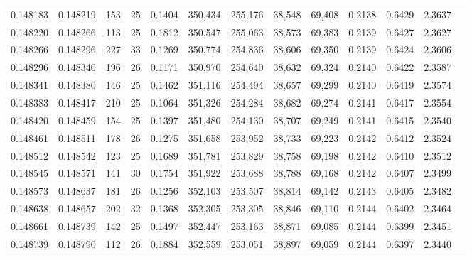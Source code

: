 \begin{tabular}{rrrrrrrrrrrrr}
0.148183 & 0.148219 & 153 &  25 &                                     0.1404 & 350,434 & 255,176 &  38,548 &  69,408 & 0.2138 & 0.6429 & 2.3637 \\
0.148220 & 0.148266 & 113 &  25 &                                     0.1812 & 350,547 & 255,063 &  38,573 &  69,383 & 0.2139 & 0.6427 & 2.3627 \\
0.148266 & 0.148296 & 227 &  33 &                                     0.1269 & 350,774 & 254,836 &  38,606 &  69,350 & 0.2139 & 0.6424 & 2.3606 \\
0.148296 & 0.148340 & 196 &  26 &                                     0.1171 & 350,970 & 254,640 &  38,632 &  69,324 & 0.2140 & 0.6422 & 2.3587 \\
0.148341 & 0.148380 & 146 &  25 &                                     0.1462 & 351,116 & 254,494 &  38,657 &  69,299 & 0.2140 & 0.6419 & 2.3574 \\
0.148383 & 0.148417 & 210 &  25 &                                     0.1064 & 351,326 & 254,284 &  38,682 &  69,274 & 0.2141 & 0.6417 & 2.3554 \\
0.148420 & 0.148459 & 154 &  25 &                                     0.1397 & 351,480 & 254,130 &  38,707 &  69,249 & 0.2141 & 0.6415 & 2.3540 \\
0.148461 & 0.148511 & 178 &  26 &                                     0.1275 & 351,658 & 253,952 &  38,733 &  69,223 & 0.2142 & 0.6412 & 2.3524 \\
0.148512 & 0.148542 & 123 &  25 &                                     0.1689 & 351,781 & 253,829 &  38,758 &  69,198 & 0.2142 & 0.6410 & 2.3512 \\
0.148545 & 0.148571 & 141 &  30 &                                     0.1754 & 351,922 & 253,688 &  38,788 &  69,168 & 0.2142 & 0.6407 & 2.3499 \\
0.148573 & 0.148637 & 181 &  26 &                                     0.1256 & 352,103 & 253,507 &  38,814 &  69,142 & 0.2143 & 0.6405 & 2.3482 \\
0.148638 & 0.148657 & 202 &  32 &                                     0.1368 & 352,305 & 253,305 &  38,846 &  69,110 & 0.2144 & 0.6402 & 2.3464 \\
0.148661 & 0.148739 & 142 &  25 &                                     0.1497 & 352,447 & 253,163 &  38,871 &  69,085 & 0.2144 & 0.6399 & 2.3451 \\
0.148739 & 0.148790 & 112 &  26 &                                     0.1884 & 352,559 & 253,051 &  38,897 &  69,059 & 0.2144 & 0.6397 & 2.3440 \\

\end{tabular}
